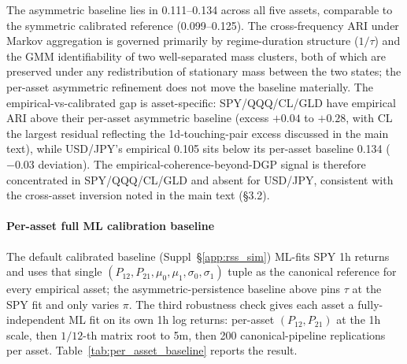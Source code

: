 \documentclass[preprint,12pt,authoryear]{elsarticle}
\begin{document}
\noindent The asymmetric baseline lies in 0.111--0.134 across all five assets, comparable to the symmetric calibrated reference (0.099--0.125). The cross-frequency ARI under Markov aggregation is governed primarily by regime-duration structure ($1/\tau$) and the GMM identifiability of two well-separated mass clusters, both of which are preserved under any redistribution of stationary mass between the two states; the per-asset asymmetric refinement does not move the baseline materially. The empirical-vs-calibrated gap is asset-specific: SPY/QQQ/CL/GLD have empirical ARI above their per-asset asymmetric baseline (excess $+0.04$ to $+0.28$, with CL the largest residual reflecting the 1d-touching-pair excess discussed in the main text), while USD/JPY's empirical 0.105 sits below its per-asset baseline 0.134 ($-0.03$ deviation). The empirical-coherence-beyond-DGP signal is therefore concentrated in SPY/QQQ/CL/GLD and absent for USD/JPY, consistent with the cross-asset inversion noted in the main text (\S{}3.2).

\paragraph{Per-asset full ML calibration baseline}
\label{app:per_asset_baseline}
The default calibrated baseline (Suppl~\S\ref{app:rss_sim}) ML-fits SPY 1h returns and uses that single $(P_{12}, P_{21}, \mu_0, \mu_1, \sigma_0, \sigma_1)$ tuple as the canonical reference for every empirical asset; the asymmetric-persistence baseline above pins $\tau$ at the SPY fit and only varies $\pi$. The third robustness check gives each asset a fully-independent ML fit on its own 1h log returns: per-asset $(P_{12}, P_{21})$ at the 1h scale, then $1/12$-th matrix root to 5m, then 200 canonical-pipeline replications per asset. Table~\ref{tab:per_asset_baseline} reports the result.
\end{document}
